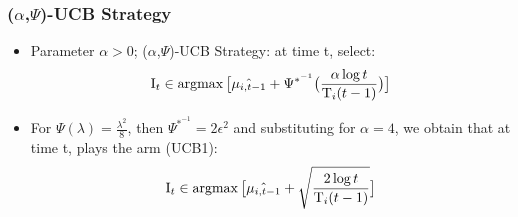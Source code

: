 \documentclass{beamer}
\DeclareMathOperator*{\argmax}{\rm argmax}
\newcommand{\mI}{{\mathrm I}}
\newcommand{\mT}{{\mathrm T}}
\begin{document}
   \begin{frame}
        \frametitle{($\alpha$,$\Psi$)-UCB Strategy}

      	\begin{itemize}
		
		\item Parameter $\alpha > 0$; ($\alpha$,$\Psi$)-UCB Strategy: at time t, select:
		 $$\mI_t \in \argmax \big[ \hat{\mu_{i,t-1}} + \Psi^{*^{-1}}   \big( \frac{\alpha \log{t}} {\mT_i (t-1)}  \big) \big]$$ 
		 
		 \item For $\Psi(\lambda) = \frac{\lambda^2}{8}$, then $\Psi^{*^{-1}} = 2 \epsilon^2$ and substituting for $\alpha=4$, we 		obtain that at  time t, plays the arm (UCB1):
		 $$\mI_t \in \argmax \big[ \hat{\mu_{i,t-1}} + \sqrt{\frac{2 \log{t}} {\mT_i (t-1)}} \big]$$ 		 
	\end{itemize}
   \end{frame}
    
\end{document}
